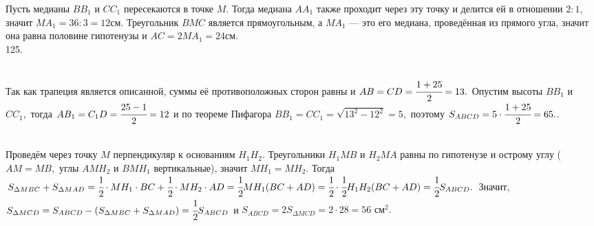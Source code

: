 \documentclass[12pt]{article}
\begin{document}
Пусть медианы $BB_1$ и $CC_1$ пересекаются в точке $M.$ Тогда медиана $AA_1$ также проходит через эту точку и делится ей в отношении $2:1,$ значит $MA_1=36:3=12$см. Треугольник $BMC$ является прямоугольным, а $MA_1$ --- это его медиана, проведённая из прямого угла, значит она равна половине гипотенузы и $AC=2MA_1=24$см.\\
125. \begin{figure}[ht!]
\end{figure}\\
Так как трапеция является описанной, суммы её противоположных сторон равны и $AB=CD=\cfrac{1+25}{2}=13.$ Опустим высоты $BB_1$ и $CC_1,$ тогда $AB_1=C_1D=\cfrac{25-1}{2}=12$ и по теореме Пифагора $BB_1=CC_1=\sqrt{13^2-12^2}=5,$ поэтому $S_{ABCD}=5\cdot\cfrac{1+25}{2}=65.$\newpage{}. \begin{figure}[ht!]
\end{figure}\\
Проведём через точку $M$ перпендикуляр к основаниям $H_1H_2.$ Треугольники $H_1MB$ и $H_2MA$ равны по гипотенузе и острому углу ($AM=MB,$ углы $AMH_2$ и $BMH_1$ вертикальные), значит $MH_1=MH_2.$ Тогда $S_{\Delta MBC}+S_{\Delta MAD}=\cfrac{1}{2}\cdot MH_1\cdot BC+\cfrac{1}{2}\cdot MH_2\cdot AD=\cfrac{1}{2}MH_1(BC+AD)=
\cfrac{1}{2}\cdot\cfrac{1}{2}H_1H_2(BC+AD)=\cfrac{1}{2}S_{ABCD}.$ Значит, $S_{\Delta MCD}=S_{ABCD}-(S_{\Delta MBC}+S_{\Delta MAD})=\cfrac{1}{2}S_{ABCD}$ и $S_{ABCD}=2S_{\Delta MCD}=2\cdot28=56\text{ см}^2.$\\
\end{document}

